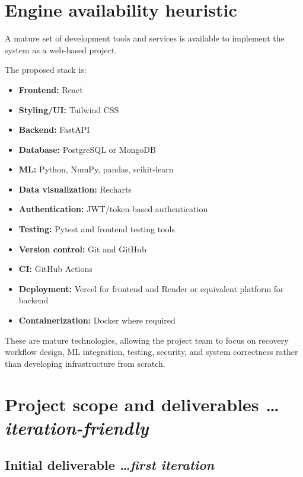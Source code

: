 \documentclass[11pt,a4paper]{article}
\newcommand{\BvrHint}[1]{%
  {\normalfont\normalsize\itshape\hfill #1}}
\begin{document}
\section{Engine availability heuristic}

A mature set of development tools and services is available
to implement the system as a web-based project.

The proposed stack is:
\begin{itemize}[leftmargin=0.7cm]
    \item \textbf{Frontend:} React
    \item \textbf{Styling/UI:} Tailwind CSS
    \item \textbf{Backend:} FastAPI
    \item \textbf{Database:} PostgreSQL or MongoDB
    \item \textbf{ML:} Python, NumPy, pandas, scikit-learn
    \item \textbf{Data visualization:} Recharts
    \item \textbf{Authentication:} JWT/token-based authentication
    \item \textbf{Testing:} Pytest and frontend testing tools
    \item \textbf{Version control:} Git and GitHub
    \item \textbf{CI:} GitHub Actions
    \item \textbf{Deployment:} Vercel for frontend and Render or equivalent platform for backend
    \item \textbf{Containerization:} Docker where required
\end{itemize}

These are mature technologies, allowing the project team to
focus on recovery workflow design, ML integration, testing, security, and
system correctness rather than developing infrastructure from scratch.

\section{Project scope and deliverables %
\BvrHint{\ldots iteration-friendly}}

\subsection{Initial deliverable %
\BvrHint{\ldots first iteration}}
\end{document}
